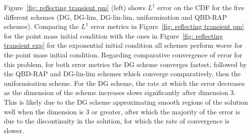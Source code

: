 Figure~\ref{fig: reflecting transient pm} (left) shows \(L^1\) error on the CDF for the five different schemes (DG, DG-lim, DG-lin-lim, uniformisation and QBD-RAP schemes). Comparing the \(L^1\) error metrics in Figure~\ref{fig: reflecting transient pm} for the point mass initial condition with the ones in Figure~\ref{fig: reflecting transient exp} for the exponential initial condition all schemes perform worse for the point mass initial condition. Regarding comparative convergence of error for this problem, for both error metrics the DG scheme converges fastest, followed by the QBD-RAP and DG-lin-lim schemes which converge comparatively, then the uniformisation scheme. For the DG scheme, the rate at which the error decreases as the dimension of the scheme increases slows significantly after dimension 3. This is likely due to the DG scheme approximating smooth regions of the solution well when the dimension is 3 or greater, after which the majority of the error is due to the discontinuity in the solution, for which the rate of convergence is slower. 
%

